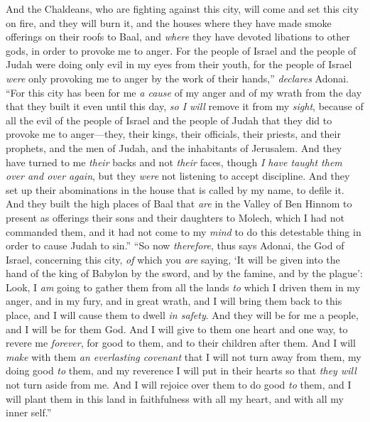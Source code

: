 \begin{biblechapter}
\verse And the Chaldeans, who are fighting against this city, will come and set this city on fire, and they will burn it, and the houses where they have made smoke offerings on their roofs to Baal, and \textit{where} they have devoted libations to other gods, in order to provoke me to anger.
\verse For the people of Israel and the people of Judah were doing only evil in my eyes from their youth, for the people of Israel \textit{were} only provoking me to anger by the work of their hands,” \textit{declares} Adonai.
\verse “For this city has been for me \textit{a cause} of my anger and of my wrath from the day that they built it even until this day, \textit{so I will} remove it from my \textit{sight},
\verse because of all the evil of the people of Israel and the people of Judah that they did to provoke me to anger—they, their kings, their officials, their priests, and their prophets, and the men of Judah, and the inhabitants of Jerusalem.
\verse And they have turned to me \textit{their} backs and not \textit{their} faces, though \textit{I have taught them over and over again}, but they \textit{were} not listening to accept discipline.
\verse And they set up their abominations in the house that is called by my name, to defile it.
\verse And they built the high places of Baal that \textit{are} in the Valley of Ben Hinnom to present as offerings their sons and their daughters to Molech, which I had not commanded them, and it had not come to my \textit{mind} to do this detestable thing in order to cause Judah to sin.”
\verse “So now \textit{therefore}, thus says Adonai, the God of Israel, concerning this city, \textit{of} which you \textit{are} saying, ‘It will be given into the hand of the king of Babylon by the sword, and by the famine, and by the plague’:
\verse Look, I \textit{am} going to gather them from all the lands \textit{to} which I driven them in my anger, and in my fury, and in great wrath, and I will bring them back to this place, and I will cause them to dwell \textit{in safety}.
\verse And they will be for me a people, and I will be for them God.
\verse And I will give to them one heart and one way, to revere me \textit{forever}, for good to them, and to their children after them.
\verse And I will \textit{make} with them \textit{an everlasting covenant} that I will not turn away from them, my doing good \textit{to} them, and my reverence I will put in their hearts so that \textit{they will} not turn aside from me.
\verse And I will rejoice over them to do good \textit{to} them, and I will plant them in this land in faithfulness with all my heart, and with all my inner self.”

\end{biblechapter}
